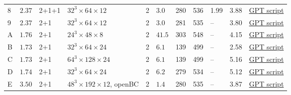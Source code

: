 \documentclass[landscape]{article}
\newcommand{\gr}[1]{{\color{gray} #1}}
\begin{document}
\begin{center}
\begin{tabular}{l|lllllllll|l}
  8 & \gr{$2.37$} & 2+1+1 & $32^3 \times 64 \times 12$ & 2 & \gr{$3.0$} & \gr{280} & \gr{536} & \gr{1.99} & \gr{3.88} & \href{https://github.com/lehner/gpt/tree/master/applications/hmc/dwf/ensemble8.py}{GPT script} \\
  9 & $2.37$ & 2+1 & $32^3 \times 64 \times 12$ & 2 & $3.0$ & 281 & 535 & -- & 3.80 & \href{https://github.com/lehner/gpt/tree/master/applications/hmc/dwf/ensemble9.py}{GPT script} \\
  A & $1.76$ & 2+1 & $24^3 \times 48 \times 8$ & 2 & $41.5$ & 303 & 548 & -- & 4.15 & \href{https://github.com/lehner/gpt/tree/master/applications/hmc/dwf/ensembleA.py}{GPT script} \\
  B & $1.73$ & 2+1 & $32^3 \times 64 \times 24$ & 2 & $6.1$ & \gr{139} & \gr{499} & -- & \gr{2.58} &  \href{https://github.com/lehner/gpt/tree/master/applications/hmc/dwf/ensembleB.py}{GPT script}\\
  C & $1.73$ & 2+1 & $64^3 \times 128 \times 24$ & 2 & $6.1$ & \gr{139} & \gr{499} & -- & \gr{5.16} &  \href{https://github.com/lehner/gpt/tree/master/applications/hmc/dwf/ensembleC.py}{GPT script}\\
  D & $1.74$ & 2+1 & $32^3 \times 64 \times 24$ & 2 & $6.2$ & 279 & 534 & -- & 5.12 & \href{https://github.com/lehner/gpt/tree/master/applications/hmc/dwf/ensembleD.py}{GPT script} \\
  E & \gr{$3.50$} & 2+1 & $48^3 \times 192 \times 12$, openBC & 2 & \gr{$1.4$} & \gr{280} & \gr{535} & -- & \gr{3.87} & \href{https://github.com/lehner/gpt/tree/master/applications/hmc/dwf/ensembleE.py}{GPT script} \\
\end{tabular}

\end{center}
\end{document}

